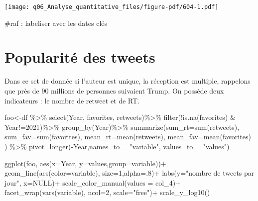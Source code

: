 \documentclass[
  letterpaper,
  DIV=11,
  numbers=noendperiod]{scrreprt}
\newenvironment{Shaded}{\begin{snugshade}}{\end{snugshade}}
\newcommand{\AttributeTok}[1]{\textcolor[rgb]{0.40,0.45,0.13}{#1}}
\newcommand{\CommentTok}[1]{\textcolor[rgb]{0.37,0.37,0.37}{#1}}
\newcommand{\ConstantTok}[1]{\textcolor[rgb]{0.56,0.35,0.01}{#1}}
\newcommand{\DecValTok}[1]{\textcolor[rgb]{0.68,0.00,0.00}{#1}}
\newcommand{\FunctionTok}[1]{\textcolor[rgb]{0.28,0.35,0.67}{#1}}
\newcommand{\NormalTok}[1]{\textcolor[rgb]{0.00,0.23,0.31}{#1}}
\newcommand{\OtherTok}[1]{\textcolor[rgb]{0.00,0.23,0.31}{#1}}
\newcommand{\SpecialCharTok}[1]{\textcolor[rgb]{0.37,0.37,0.37}{#1}}
\newcommand{\StringTok}[1]{\textcolor[rgb]{0.13,0.47,0.30}{#1}}
\begin{document}
\texttt{[image: q06\_Analyse\_quantitative\_files/figure-pdf/604-1.pdf]}

\begin{Shaded}
\begin{Highlighting}[]
\CommentTok{\#raf : labeliser avec les dates clés}
\end{Highlighting}
\end{Shaded}

\section{Popularité des tweets}\label{popularituxe9-des-tweets}

Dans ce set de donnée si l'auteur est unique, la réception est multiple,
rappelons que près de 90 millions de personnes suivaient Trump. On
possède deux indicateurs : le nombre de retweet et de RT.

\begin{Shaded}
\begin{Highlighting}[]
\NormalTok{foo}\OtherTok{\textless{}{-}}\NormalTok{df }\SpecialCharTok{\%\textgreater{}\%} \FunctionTok{select}\NormalTok{(Year, favorites, retweets)}\SpecialCharTok{\%\textgreater{}\%}
  \FunctionTok{filter}\NormalTok{(}\SpecialCharTok{!}\FunctionTok{is.na}\NormalTok{(favorites) }\SpecialCharTok{\&}\NormalTok{ Year}\SpecialCharTok{!=}\DecValTok{2021}\NormalTok{)}\SpecialCharTok{\%\textgreater{}\%}
  \FunctionTok{group\_by}\NormalTok{(Year)}\SpecialCharTok{\%\textgreater{}\%}
  \FunctionTok{summarize}\NormalTok{(}\AttributeTok{sum\_rt=}\FunctionTok{sum}\NormalTok{(retweets),}
            \AttributeTok{sum\_fav=}\FunctionTok{sum}\NormalTok{(favorites),}
            \AttributeTok{mean\_rt=}\FunctionTok{mean}\NormalTok{(retweets),}
            \AttributeTok{mean\_fav=}\FunctionTok{mean}\NormalTok{(favorites)}
\NormalTok{            ) }\SpecialCharTok{\%\textgreater{}\%}
  \FunctionTok{pivot\_longer}\NormalTok{(}\SpecialCharTok{{-}}\NormalTok{Year,}\AttributeTok{names\_to =} \StringTok{"variable"}\NormalTok{, }\AttributeTok{values\_to =} \StringTok{"values"}\NormalTok{)}

\FunctionTok{ggplot}\NormalTok{(foo, }\FunctionTok{aes}\NormalTok{(}\AttributeTok{x=}\NormalTok{Year, }\AttributeTok{y=}\NormalTok{values,}\AttributeTok{group=}\NormalTok{variable))}\SpecialCharTok{+}
  \FunctionTok{geom\_line}\NormalTok{(}\FunctionTok{aes}\NormalTok{(}\AttributeTok{color=}\NormalTok{variable), }\AttributeTok{size=}\DecValTok{1}\NormalTok{,}\AttributeTok{alpha=}\NormalTok{.}\DecValTok{8}\NormalTok{)}\SpecialCharTok{+}
  \FunctionTok{labs}\NormalTok{(}\AttributeTok{y=}\StringTok{"nombre de tweets par jour"}\NormalTok{, }\AttributeTok{x=}\ConstantTok{NULL}\NormalTok{)}\SpecialCharTok{+}
  \FunctionTok{scale\_color\_manual}\NormalTok{(}\AttributeTok{values =}\NormalTok{ col\_4)}\SpecialCharTok{+} 
  \FunctionTok{facet\_wrap}\NormalTok{(}\FunctionTok{vars}\NormalTok{(variable), }\AttributeTok{ncol=}\DecValTok{2}\NormalTok{, }\AttributeTok{scale=}\StringTok{"free"}\NormalTok{)}\SpecialCharTok{+}
  \FunctionTok{scale\_y\_log10}\NormalTok{()}
\end{Highlighting}
\end{Shaded}
\end{document}
